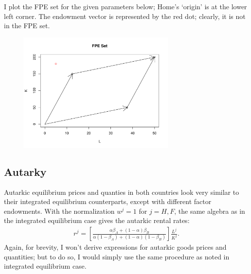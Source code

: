 \documentclass[12pt]{article}
\begin{document}
I plot the FPE set for the given parameters below; Home's `origin' is at the lower left corner. The endowment vector is represented by the red dot; clearly, it is not in the FPE set.

\begin{figure}[!htpb]
    \centering
    
        \includegraphics[width=0.7\textwidth]{fpeset.pdf}

\end{figure}

\subsection{Autarky}
Autarkic equilibrium prices and quanties in both countries look very similar to their integrated equilibrium counterparts, except with different factor endowments. With the normalization $w^j = 1$ for $j = H,F$, the same algebra as in the integrated equilibrium case gives the autarkic rental rates:
\begin{align*}
r^j = \left[\frac{\alpha\beta_A + (1-\alpha)\beta_B}{\alpha(1-\beta_A) + (1-\alpha)(1-\beta_B)}\right] \frac{L^j}{K^j}.
\end{align*}
Again, for brevity, I won't derive expressions for autarkic goods prices and quantities; but to do so, I would simply use the same procedure as noted in integrated equilibrium case.  \\
\end{document}

